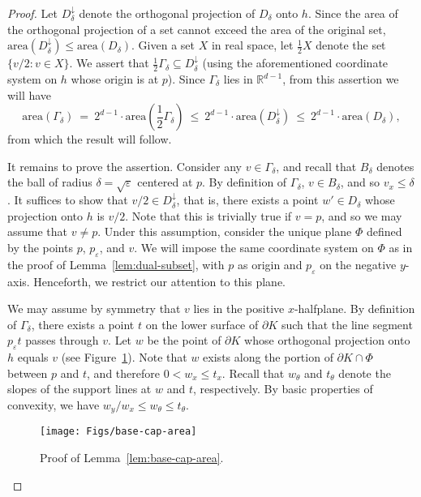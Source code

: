 \documentclass[11pt]{article}   \usepackage[letterpaper,hmargin=2.1cm,vmargin=3cm]{geometry}
\newcommand{\RE}{\mathbb{R}}    \newcommand{\ZZ}{\mathbb{Z}}    \newcommand{\eps}{\varepsilon}  \newcommand{\ST}{\,:\,}         \newcommand{\sq}{\square}
\newcommand{\inv}[1]{\frac{1}{#1}}
\newcommand{\area}{\mathrm{area}}
\begin{document}
\begin{proof}
Let $D^{\downarrow}_{\delta}$ denote the orthogonal projection of $D_{\delta}$ onto $h$. Since the area of the orthogonal projection of a set cannot exceed the area of the original set, $\area(D^{\downarrow}_{\delta}) \le \area(D_{\delta})$. Given a set $X$ in real space, let $\inv{2} X$ denote the set $\{v/2 : v \in X\}$. We assert that $\inv{2} \Gamma_{\delta} \subseteq D^{\downarrow}_{\delta}$ (using the aforementioned coordinate system on $h$ whose origin is at $p$). Since $\Gamma_{\delta}$ lies in $\RE^{d-1}$, from this assertion we will have
\[
	\area(\Gamma_{\delta})
		~  =  ~ 2^{d-1} \cdot \area\left(\textstyle \inv{2} \Gamma_{\delta}\right)
		~ \le ~ 2^{d-1} \cdot \area(D^{\downarrow}_{\delta})
		~ \le ~ 2^{d-1} \cdot \area(D_{\delta}),
\]
from which the result will follow.

It remains to prove the assertion. Consider any $v \in \Gamma_{\delta}$, and recall that $B_{\delta}$ denotes the ball of radius $\delta = \sqrt{\eps}$ centered at $p$. By definition of $\Gamma_{\delta}$, $v \in B_{\delta}$, and so $v_x \le \delta$. It suffices to show that $v/2 \in D^{\downarrow}_{\delta}$, that is, there exists a point $w' \in D_{\delta}$ whose projection onto $h$ is $v/2$. Note that this is trivially true if $v = p$, and so we may assume that $v \ne p$. Under this assumption, consider the unique plane $\Phi$ defined by the points $p$, $p_{\eps}$, and $v$. We will impose the same coordinate system on $\Phi$ as in the proof of Lemma~\ref{lem:dual-subset}, with $p$ as origin and $p_{\eps}$ on the negative $y$-axis. Henceforth, we restrict our attention to this plane.

We may assume by symmetry that $v$ lies in the positive $x$-halfplane. By definition of $\Gamma_{\delta}$, there exists a point $t$ on the lower surface of $\partial K$ such that the line segment $p_{\eps} t$ passes through $v$. Let $w$ be the point of $\partial K$ whose orthogonal projection onto $h$ equals $v$ (see Figure~\ref{fig:base-cap-area}). Note that $w$ exists along the portion of $\partial K \cap \Phi$ between $p$ and $t$, and therefore $0 < w_x \le t_x$. Recall that $w_{\theta}$ and $t_{\theta}$ denote the slopes of the support lines at $w$ and $t$, respectively. By basic properties of convexity, we have $w_y/w_x \le w_{\theta} \le t_{\theta}$.

\begin{figure}[htbp]
  \centerline{\texttt{[image: Figs/base-cap-area]}}
  \caption{Proof of Lemma~\ref{lem:base-cap-area}.}
  \label{fig:base-cap-area}
\end{figure}



\end{proof}
\end{document}
